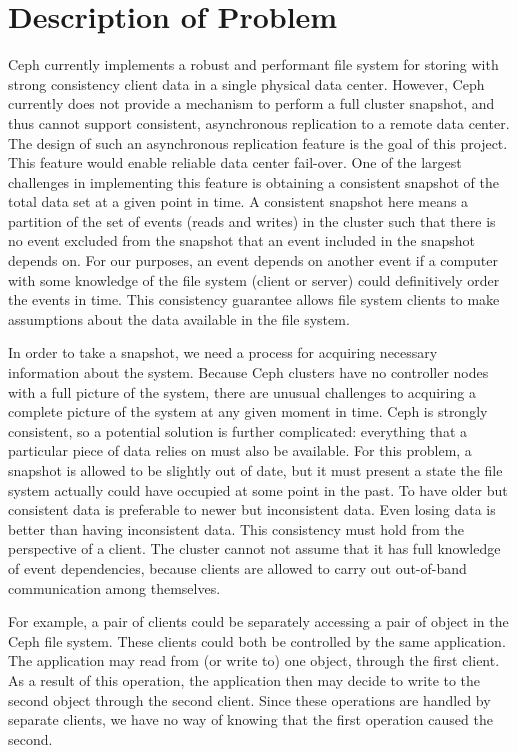 \chapter{Description of Problem}
\label{sec:description}

Ceph currently implements a robust and performant file system for storing
with strong consistency client data in a single physical data center. 
However, Ceph currently does not provide a mechanism to perform a full cluster
snapshot, and thus cannot support consistent, asynchronous replication
to a remote data center. The design of such an asynchronous
replication feature is the goal of this project.  This feature would
enable reliable data center fail-over. One of the largest challenges
in implementing this feature is obtaining a consistent snapshot of the
total data set at a given point in time. A consistent snapshot here
means a partition of the set of events (reads and writes) in the
cluster such that there is no event excluded from the snapshot that an
event included in the snapshot depends on. For our purposes, an event 
depends on another event if a computer with some knowledge of the 
file system (client or server) could definitively order the events in time.
This consistency guarantee allows file system clients to make
assumptions about the data available in the file system. 

In order to take a snapshot, we need a process for acquiring necessary
information about the system.
Because Ceph clusters have no controller nodes with a full picture of
the system, there are unusual challenges to acquiring a complete
picture of the system at any given moment in time. Ceph is strongly
consistent, so a potential solution is further complicated: everything
that a particular piece of data relies on must also be available. For
this problem, a snapshot is allowed to be slightly out of date, but it
must present a state the file system actually could have occupied at
some point in the past. To have older but consistent data is
preferable to newer but inconsistent data. Even losing data is better
than having inconsistent data. This consistency must hold from the
perspective of a client. The cluster cannot not assume that it has
full knowledge of event dependencies, because clients are allowed to
carry out out-of-band communication among themselves.

For example, a pair of clients could be separately accessing a pair
of object in the Ceph file system. These clients could both be
controlled by the same application. The application may read from 
(or write to) one 
object, through the first client. As a result of this operation,
the application then may decide to write to the second object 
through the second client. Since these operations are 
handled by separate clients, we have no way of knowing that the first
operation caused the second.

